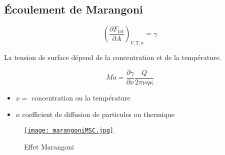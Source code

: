 \documentclass[10pt]{beamer}
\begin{document}
\subsection{Écoulement de Marangoni}

\begin{frame}[fragile]{\insertsubsection}
    \begin{minipage}{.45\linewidth}

        \begin{equation}
            \left( \dfrac{\partial F_{tot}}{\partial A}\right)_{V,T,n}=\gamma
        \end{equation}

        La tension de surface dépend de la concentration et de la température. 

        \begin{equation} 
            Ma = \dfrac{\partial \gamma}{\partial x} \dfrac{Q}{2 \pi \nu \eta\kappa} 
        \end{equation}

        \begin{itemize}
            \item $x =$ concentration ou la température
            \item $\kappa$ coefficient de diffusion de particules ou thermique
        \end{itemize}
    \end{minipage}
    \begin{minipage}{.45\linewidth}
        \begin{figure}[ht]
            \centering
            \href{https://hebergement.universite-paris-saclay.fr/supraconductivite/marangoni/marangoni.html#home}{\texttt{[image: marangoniMSC.jpg]}}
            \caption{Effet Marangoni }
        \end{figure}
    \end{minipage}
\end{frame}
\end{document}
